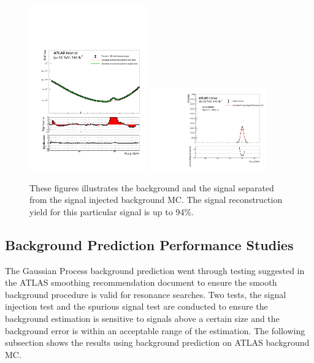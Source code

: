 \begin{figure}[!htb]
    \begin{center}
        \includegraphics[width=0.45\textwidth]{figures/chapter_dimuon//BackgroundSeparated}        
        \includegraphics[width=0.45\textwidth]{figures/chapter_dimuon/SignalSeparated}        
        \caption{
            These figures illustrates the background and the signal separated from the signal injected background MC. The signal reconstruction yield for this particular signal is up to 94\%.
        }
        \label{fig:signalseparation}
    \end{center}
\end{figure}
\FloatBarrier


\subsection{Background Prediction Performance Studies}
The Gaussian Process background prediction went through testing suggested in the ATLAS smoothing recommendation document to ensure the smooth background procedure is valid for resonance searches. Two tests, the signal injection test and the spurious signal test are conducted to ensure the background estimation is sensitive to signals above a certain size and the background error is within an acceptable range of the estimation. The following subsection shows the results using background prediction on ATLAS background MC.  

